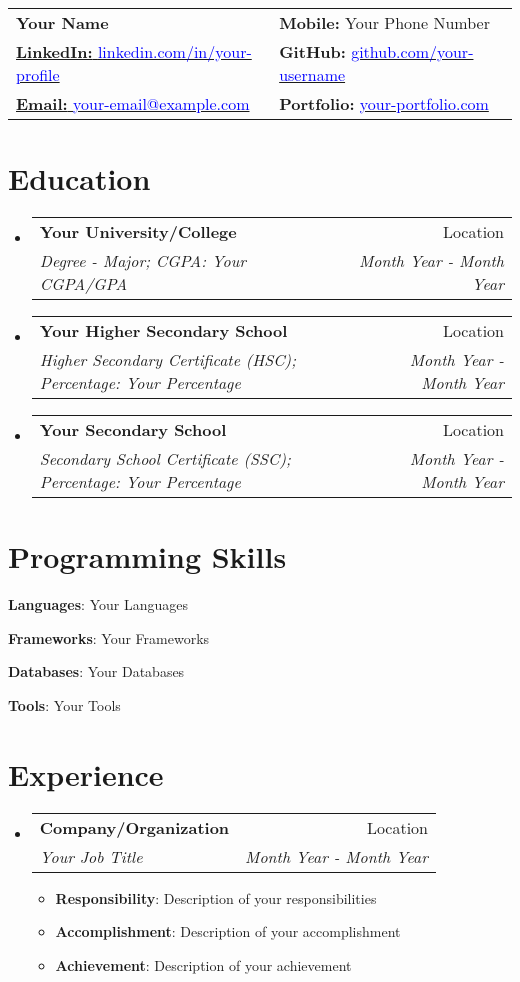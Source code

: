 \documentclass[a4paper,11pt]{article}
\makeatletter
\newcommand{\resumeItem}[2]{\item\small{\textbf{#1}: #2 \vspace{-2pt}}}
\newcommand{\resumeSubheading}[4]{
  \vspace{-1pt}\item
  \begin{tabular*}{0.97\textwidth}{l@{\extracolsep{\fill}}r}
    \textbf{#1} & #2 \\
    \textit{#3} & \textit{#4} \\
  \end{tabular*}\vspace{-5pt}
}
\newcommand{\resumeSubHeadingListStart}{\begin{itemize}[leftmargin=*]}
\newcommand{\resumeSubHeadingListEnd}{\end{itemize}}
\newcommand{\resumeItemListStart}{\begin{itemize}[label={$\bullet$}, leftmargin=*]}
\newcommand{\resumeItemListEnd}{\end{itemize}\vspace{-5pt}}
\makeatother
\begin{document}
\begin{tabular*}{\textwidth}{@{\extracolsep{\fill}}ll}
  \textbf{{\LARGE Your Name}} & \textbf{Mobile:} Your Phone Number \\
  \href{https://www.linkedin.com/in/your-profile}{\textbf{LinkedIn:} \textcolor{blue}{linkedin.com/in/your-profile}} & \textbf{GitHub:} \href{https://github.com/your-username}{\textcolor{blue}{github.com/your-username}} \\
  \href{mailto:your-email@example.com}{\textbf{Email:} \textcolor{blue}{your-email@example.com}} & \textbf{Portfolio:} \href{https://your-portfolio.com}{\textcolor{blue}{your-portfolio.com}}
\end{tabular*}

\section{\textbf{{\LARGE Education}}}
\resumeSubHeadingListStart
  \resumeSubheading
  {Your University/College}{Location}
  {Degree - Major; CGPA: Your CGPA/GPA}{Month Year - Month Year}
  \resumeSubheading
  {Your Higher Secondary School}{Location}
  {Higher Secondary Certificate (HSC); Percentage: Your Percentage}{Month Year - Month Year}
  \resumeSubheading
  {Your Secondary School}{Location}
  {Secondary School Certificate (SSC); Percentage: Your Percentage}{Month Year - Month Year}
\resumeSubHeadingListEnd

\section{\textbf{{\LARGE Programming Skills}}}
\begin{description}[font=$\bullet$]
\item{\textbf{Languages}: Your Languages}
  \item{\textbf{Frameworks}: Your Frameworks}
  \item{\textbf{Databases}: Your Databases}
  \item{\textbf{Tools}: Your Tools}
\end{description}

\section{\textbf{{\LARGE Experience}}}
\resumeSubHeadingListStart
  \resumeSubheading
  {Company/Organization}{Location}
  {Your Job Title}{Month Year - Month Year}
  \resumeItemListStart
    \resumeItem{Responsibility}
    {Description of your responsibilities}
    \resumeItem{Accomplishment}
    {Description of your accomplishment}
    \resumeItem{Achievement}
    {Description of your achievement}
  \resumeItemListEnd
\resumeSubHeadingListEnd
\end{document}
